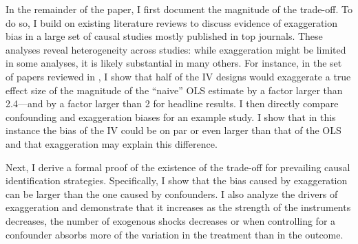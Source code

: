 			In the remainder of the paper, I first document the magnitude of the trade-off. To do so, I build on existing literature reviews \citep{brodeur_methods_2020, young_consistency_2022, lalHow2024} to discuss evidence of exaggeration bias in a large set of causal studies mostly published in top journals. %
			These analyses reveal heterogeneity across studies: while exaggeration might be limited in some analyses, it is likely substantial in many others. 
			For instance, in the set of papers reviewed in \cite{young_consistency_2022}, I show that 
			half of the IV designs would exaggerate a true effect size of the magnitude of the ``naive'' OLS estimate by a factor larger than 2.4---and by a factor larger than 2 for headline results. %
			I then directly compare confounding and exaggeration biases for an example study. I show that in this instance the bias of the IV could be on par or even larger than that of the OLS and that exaggeration may explain this difference. 
			
			Next, I derive a formal proof of the existence of the trade-off for prevailing causal identification strategies. Specifically, I show that the bias caused by exaggeration can be larger than the one caused by confounders. I also analyze the drivers of exaggeration and demonstrate that it increases as the strength of the instruments decreases, the number of exogenous shocks decreases or when controlling for a confounder absorbs more of the variation in the treatment than in the outcome. 
			
